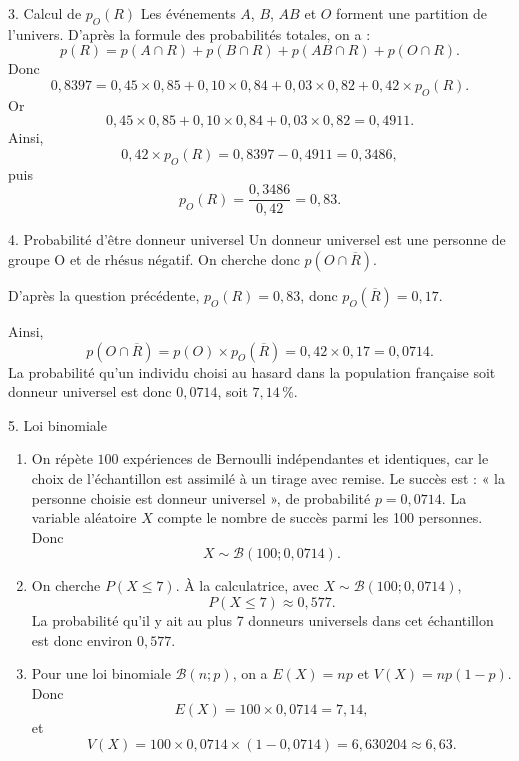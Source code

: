 \documentclass[11pt,a4paper]{article}
\begin{document}
\begin{correctionbox}{3. Calcul de $p_O(R)$}
Les événements $A$, $B$, $AB$ et $O$ forment une partition de l'univers. D'après la formule des probabilités totales, on a :
\[
p(R)=p(A\cap R)+p(B\cap R)+p(AB\cap R)+p(O\cap R).
\]
Donc
\[
0{,}8397=0{,}45\times0{,}85+0{,}10\times0{,}84+0{,}03\times0{,}82+0{,}42\times p_O(R).
\]
Or
\[
0{,}45\times0{,}85+0{,}10\times0{,}84+0{,}03\times0{,}82=0{,}4911.
\]
Ainsi,
\[
0{,}42\times p_O(R)=0{,}8397-0{,}4911=0{,}3486,
\]
puis
\[
p_O(R)=\dfrac{0{,}3486}{0{,}42}=0{,}83.
\]
\end{correctionbox}

\begin{correctionbox}{4. Probabilité d'être donneur universel}
Un donneur universel est une personne de groupe O et de rhésus négatif. On cherche donc $p(O\cap \overline R)$.

D'après la question précédente, $p_O(R)=0{,}83$, donc $p_O(\overline R)=0{,}17$.

Ainsi,
\[
p(O\cap \overline R)=p(O)\times p_O(\overline R)=0{,}42\times0{,}17=0{,}0714.
\]
La probabilité qu'un individu choisi au hasard dans la population française soit donneur universel est donc $0{,}0714$, soit $7{,}14\,\%$.
\end{correctionbox}

\begin{correctionbox}{5. Loi binomiale}
\begin{enumerate}
  \item On répète $100$ expériences de Bernoulli indépendantes et identiques, car le choix de l'échantillon est assimilé à un tirage avec remise. Le succès est : « la personne choisie est donneur universel », de probabilité $p=0{,}0714$. La variable aléatoire $X$ compte le nombre de succès parmi les 100 personnes. Donc
  \[
  X\sim \mathcal B(100;0{,}0714).
  \]

  \item On cherche $P(X\leqslant 7)$. À la calculatrice, avec $X\sim\mathcal B(100;0{,}0714)$,
  \[
  P(X\leqslant 7)\approx 0{,}577.
  \]
  La probabilité qu'il y ait au plus 7 donneurs universels dans cet échantillon est donc environ $0{,}577$.

  \item Pour une loi binomiale $\mathcal B(n;p)$, on a $E(X)=np$ et $V(X)=np(1-p)$. Donc
  \[
  E(X)=100\times0{,}0714=7{,}14,
  \]
  et
  \[
  V(X)=100\times0{,}0714\times(1-0{,}0714)=6{,}630204\approx 6{,}63.
  \]
\end{enumerate}
\end{correctionbox}
\end{document}
